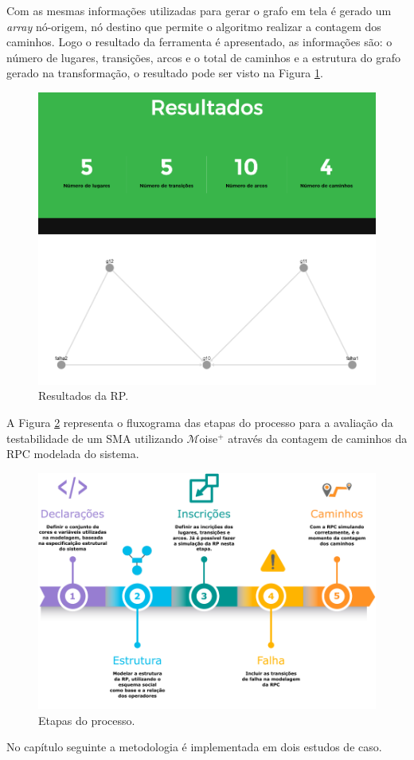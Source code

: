 Com as mesmas informações utilizadas para gerar o grafo em tela é gerado um \textit{array} nó-origem, nó destino que permite o algoritmo realizar a contagem dos caminhos. Logo o resultado da ferramenta é apresentado, as informações são: o número de lugares, transições, arcos e o total de caminhos e a estrutura do grafo gerado na transformação, o resultado pode ser visto na Figura \ref{fig:4-resultado}.

\begin{figure}[ht]
\centering
\includegraphics[scale=0.3]{imagens/4-resultado.png}
\caption{Resultados da RP.}
\label{fig:4-resultado}
\end{figure}


A Figura \ref{fig:4-fluxograma} representa o fluxograma das etapas do processo para a avaliação da testabilidade de um SMA utilizando $\mathcal{M}$oise$^{+}$ através da contagem de caminhos da RPC modelada do sistema.


\begin{figure}[ht]
\centering
\includegraphics[scale=0.9]{imagens/4-fluxograma.pdf}
\caption{Etapas do processo.}
\label{fig:4-fluxograma}
\end{figure}

No capítulo seguinte a metodologia é implementada em dois estudos de caso. 